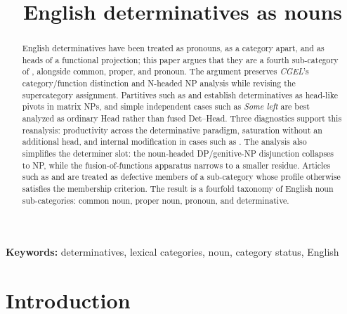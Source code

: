 \documentclass[12pt]{article}
\title{English determinatives as nouns}
\author{}
\date{}
\begin{document}
\maketitle

\begin{abstract}
English determinatives have been treated as pronouns, as a category apart, and as heads of a functional projection; this paper argues that they are a fourth sub-category of , alongside common, proper, and pronoun. The argument preserves \textit{CGEL}'s category/function distinction and N-headed NP analysis while revising the supercategory assignment. Partitives such as  and  establish determinatives as head-like pivots in matrix NPs, and simple independent cases such as \textit{Some left} are best analyzed as ordinary Head rather than fused Det--Head. Three diagnostics support this reanalysis: productivity across the determinative paradigm, saturation without an additional head, and internal modification in cases such as . The analysis also simplifies the determiner slot: the noun-headed DP/genitive-NP disjunction collapses to NP, while the fusion-of-functions apparatus narrows to a smaller residue. Articles such as  and  are treated as defective members of a sub-category whose profile otherwise satisfies the membership criterion. The result is a fourfold taxonomy of English noun sub-categories: common noun, proper noun, pronoun, and determinative.
\end{abstract}

\noindent\textbf{Keywords:} determinatives, lexical categories, noun, category status, English

\section{Introduction}\label{sec:intro}
\end{document}
